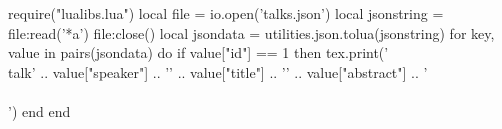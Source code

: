 \documentclass[a5paper]{article}
\begin{document}

\begin{luacode}
require("lualibs.lua")
local file = io.open('talks.json')
local jsonstring = file:read('*a')
file:close()
local jsondata =  utilities.json.tolua(jsonstring)
for key, value in pairs(jsondata) do
  if value["id"] == 1 then 
      tex.print('\\talk{' .. 
        value["speaker"]  .. 
        '}{'              .. 
        value["title"]    .. 
        '}{'              .. 
        value["abstract"] .. 
        '}\\\\[1em]')
  end
end
\end{luacode}
 
\end{document}
